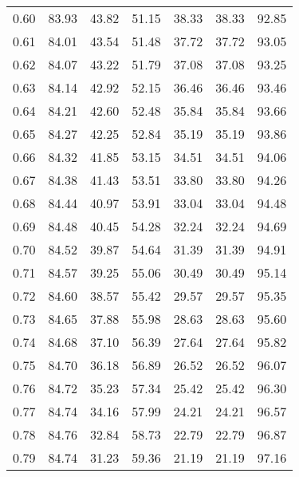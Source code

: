 \begin{tabular}{|c|c|c|c|c|c|c|}
      0.60 &     83.93 &     43.82 &      51.15 &   38.33 &      38.33 &         92.85 \\
      0.61 &     84.01 &     43.54 &      51.48 &   37.72 &      37.72 &         93.05 \\
      0.62 &     84.07 &     43.22 &      51.79 &   37.08 &      37.08 &         93.25 \\
      0.63 &     84.14 &     42.92 &      52.15 &   36.46 &      36.46 &         93.46 \\
      0.64 &     84.21 &     42.60 &      52.48 &   35.84 &      35.84 &         93.66 \\
      0.65 &     84.27 &     42.25 &      52.84 &   35.19 &      35.19 &         93.86 \\
      0.66 &     84.32 &     41.85 &      53.15 &   34.51 &      34.51 &         94.06 \\
      0.67 &     84.38 &     41.43 &      53.51 &   33.80 &      33.80 &         94.26 \\
      0.68 &     84.44 &     40.97 &      53.91 &   33.04 &      33.04 &         94.48 \\
      0.69 &     84.48 &     40.45 &      54.28 &   32.24 &      32.24 &         94.69 \\
      0.70 &     84.52 &     39.87 &      54.64 &   31.39 &      31.39 &         94.91 \\
      0.71 &     84.57 &     39.25 &      55.06 &   30.49 &      30.49 &         95.14 \\
      0.72 &     84.60 &     38.57 &      55.42 &   29.57 &      29.57 &         95.35 \\
      0.73 &     84.65 &     37.88 &      55.98 &   28.63 &      28.63 &         95.60 \\
      0.74 &     84.68 &     37.10 &      56.39 &   27.64 &      27.64 &         95.82 \\
      0.75 &     84.70 &     36.18 &      56.89 &   26.52 &      26.52 &         96.07 \\
      0.76 &     84.72 &     35.23 &      57.34 &   25.42 &      25.42 &         96.30 \\
      0.77 &     84.74 &     34.16 &      57.99 &   24.21 &      24.21 &         96.57 \\
      0.78 &     84.76 &     32.84 &      58.73 &   22.79 &      22.79 &         96.87 \\
      0.79 &     84.74 &     31.23 &      59.36 &   21.19 &      21.19 &         97.16 \\

\end{tabular}
